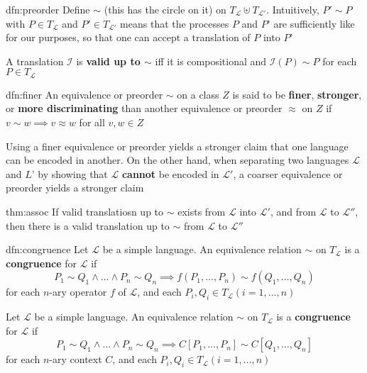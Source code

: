 \documentclass{article}
\begin{document}
\begin{dfn}{dfn:preorder}{}
    Define $\sim$ (this has the circle on it) on $T_{\mathcal{L}}\uplus T_{\mathcal{L}'}$. Intuitively, $P' \sim P$ with $P\in T_{\mathcal{L}}$ and $P'\in T_{\mathcal{L}'}$ means that the processes $P$ and $P$' are sufficiently like for our purposes, so that one can accept a translation of $P$ into $P$'

    \longrule{0.08ex}

    A translation $\mathcal{I}$ is \textbf{valid up to $\sim$} iff it is compositional and $\mathcal{I}(P) \sim P$ for each $P\in T_{\mathcal{L}}$
\end{dfn}

\begin{dfn}[Finer]{dfn:finer}{}
    An equivalence or preorder $\sim$ on a class $Z$ is said to be \textbf{finer}, \textbf{stronger}, or \textbf{more discriminating} than another equivalence or preorder $\approx$ on $Z$ if $v \sim w \implies v \approx w$ for all $v,w\in Z$
\end{dfn}

Using a finer equivalence or preorder yields a stronger claim that one language can be encoded in another. On the other hand, when separating two languages $\mathcal{L}$ and $L$' by showing that $\mathcal{L}$ \textbf{cannot} be encoded in $\mathcal{L}'$, a coarser equivalence or preorder yields a stronger claim

\begin{thm}{thm:assoc}{}
    If valid translatiosn up to $\sim$ exists from $\mathcal{L}$ into $\mathcal{L}'$, and from $\mathcal{L}$ to $\mathcal{L}''$, then there is a valid translation up to $\sim$ from $\mathcal{L}$ to $\mathcal{L}''$
\end{thm}

\newpage
\begin{dfn}[Congruence]{dfn:congruence}{}
    Let $\mathcal{L}$ be a simple language. An equivalence relation $\sim$ on $T_{\mathcal{L}}$ is a \textbf{congruence} for $\mathcal{L}$ if
    \[P_{1} \sim Q_{1} \wedge \dots \wedge P_{n} \sim Q_{n} \implies f(P_{1},\dots,P_{n}) \sim f(Q_{1},\dots,Q_{n})\]
    for each $n$-ary operator $f$ of $\mathcal{L}$, and each $P_{i}, Q_{i}\in T_{\mathcal{L}}(i = 1,\dots,n)$

    \longrule{0.08ex}

    Let $\mathcal{L}$ be a simple language. An equivalence relation $\sim$ on $T_{\mathcal{L}}$ is a \textbf{congruence} for $\mathcal{L}$ if
    \[P_{1} \sim Q_{1} \wedge \dots \wedge P_{n} \sim Q_{n} \implies C[P_{1},\dots,P_{n}] \sim C[Q_{1},\dots,Q_{n}]\]
    for each $n$-ary context $C$, and each $P_{i}, Q_{i}\in T_{\mathcal{L}}(i = 1,\dots,n)$
\end{dfn}
\end{document}
